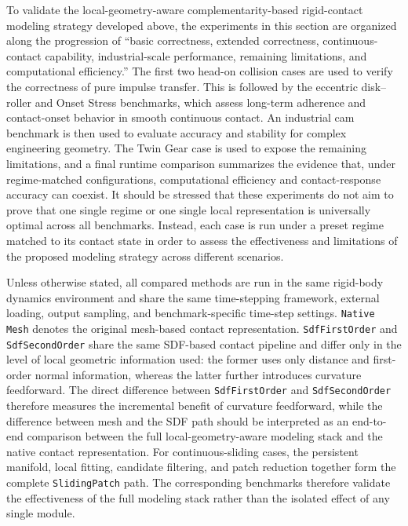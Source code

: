 To validate the local-geometry-aware complementarity-based rigid-contact modeling strategy developed above, the experiments in this section are organized along the progression of ``basic correctness, extended correctness, continuous-contact capability, industrial-scale performance, remaining limitations, and computational efficiency.'' The first two head-on collision cases are used to verify the correctness of pure impulse transfer. This is followed by the eccentric disk--roller and Onset Stress benchmarks, which assess long-term adherence and contact-onset behavior in smooth continuous contact. An industrial cam benchmark is then used to evaluate accuracy and stability for complex engineering geometry. The Twin Gear case is used to expose the remaining limitations, and a final runtime comparison summarizes the evidence that, under regime-matched configurations, computational efficiency and contact-response accuracy can coexist. It should be stressed that these experiments do not aim to prove that one single regime or one single local representation is universally optimal across all benchmarks. Instead, each case is run under a preset regime matched to its contact state in order to assess the effectiveness and limitations of the proposed modeling strategy across different scenarios.

Unless otherwise stated, all compared methods are run in the same rigid-body dynamics environment and share the same time-stepping framework, external loading, output sampling, and benchmark-specific time-step settings. \texttt{Native Mesh} denotes the original mesh-based contact representation. \texttt{SdfFirstOrder} and \texttt{SdfSecondOrder} share the same SDF-based contact pipeline and differ only in the level of local geometric information used: the former uses only distance and first-order normal information, whereas the latter further introduces curvature feedforward. The direct difference between \texttt{SdfFirstOrder} and \texttt{SdfSecondOrder} therefore measures the incremental benefit of curvature feedforward, while the difference between mesh and the SDF path should be interpreted as an end-to-end comparison between the full local-geometry-aware modeling stack and the native contact representation. For continuous-sliding cases, the persistent manifold, local fitting, candidate filtering, and patch reduction together form the complete \texttt{SlidingPatch} path. The corresponding benchmarks therefore validate the effectiveness of the full modeling stack rather than the isolated effect of any single module.

